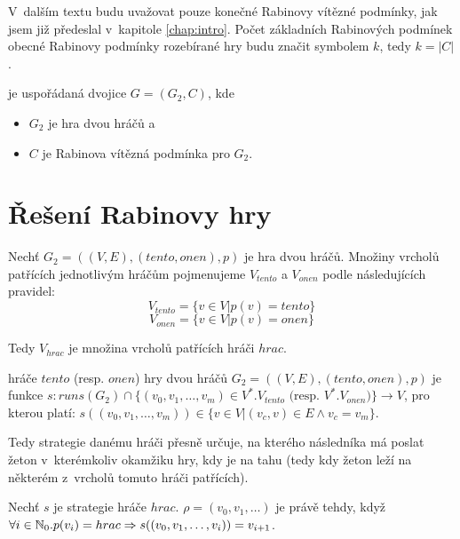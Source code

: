 V~dalším textu budu uvažovat pouze konečné Rabinovy vítězné podmínky, jak jsem již předeslal v~kapitole \ref{chap:intro}. Počet základních Rabinových podmínek obecné Rabinovy podmínky rozebírané hry budu značit symbolem $k$, tedy $k = |C|$.
\begin{definition}
 je uspořádaná dvojice $G = (G_2, C)$, kde
\begin{itemize}
\item $G_2$ je hra dvou hráčů a
\item $C$ je Rabinova vítězná podmínka pro $G_2$.
\end{itemize}
\end{definition}
\section{Řešení Rabinovy hry}
\begin{definition}
Nechť $G_2 = ((V, E), (tento, onen), p)$ je hra dvou hráčů. Množiny vrcholů patřících jednotlivým hráčům pojmenujeme $V_{tento}$ a $V_{onen}$ podle následujících pravidel:
\begin{equation}
V_{tento} = \{v \in V | p(v) = tento\}
\end{equation}
\begin{equation}
V_{onen} = \{v \in V | p(v) = onen\}
\end{equation}
\end{definition}
\begin{informal}
Tedy $V_{hrac}$ je množina vrcholů patřících hráči $hrac$.
\end{informal}
\begin{definition}
 hráče $tento$ (resp. $onen$) hry dvou hráčů $G_2 = ((V, E), (tento, onen), p)$ je funkce $s: runs(G_2) \cap \{(v_0, v_1, \dotsc, v_m) \in V^*.V_{tento} \text{ (resp. $V^*.V_{onen}$)}\} \rightarrow V$, pro kterou platí: $s((v_0, v_1, \dotsc, v_m)) \in \{v \in V | (v_c,v) \in E \wedge v_c = v_m\}$.
\end{definition}
\begin{informal}
Tedy strategie danému hráči přesně určuje, na kterého následníka má poslat žeton v~kterémkoliv okamžiku hry, kdy je na tahu (tedy kdy žeton leží na některém z~vrcholů tomuto hráči patřících).
\end{informal}
\begin{definition}
Nechť $s$ je strategie hráče $hrac$.  $\rho = (v_0, v_1, \dotsc)$ je  právě tehdy, když $\forall i \in \mathbb{N}_0. p(v_i) = hrac \Rightarrow s((v_0, v_1, \dotsc, v_i)) = v_{i+1}$.
\end{definition}
